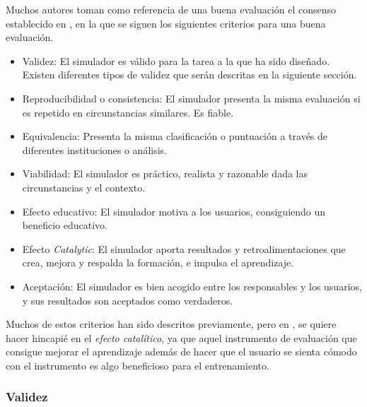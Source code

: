 Muchos autores toman como referencia de una buena evaluación el consenso establecido en  \cite{norcini2011criteria}, en la que se siguen los siguientes criterios para una buena evaluación.

\begin{itemize}
\item Validez: El simulador es válido para la tarea a la que ha sido diseñado. Existen diferentes tipos de validez que serán descritas en la siguiente sección.
\item Reproducibilidad o consistencia: El simulador presenta la misma evaluación si es repetido en circunstancias similares. Es fiable.
\item Equivalencia: Presenta la misma clasificación o puntuación a través de diferentes instituciones o análisis.
\item Viabilidad: El simulador es práctico, realista y razonable dada las circunstancias y el contexto.
\item Efecto educativo: El simulador motiva a los usuarios, consiguiendo un beneficio educativo.
\item Efecto \emph{Catalytic}: El simulador aporta resultados y retroalimentaciones que crea, mejora y respalda la formación, e impulsa el aprendizaje.
\item Aceptación: El simulador es bien acogido entre los responsables y los usuarios, y sus resultados son aceptados como verdaderos.
\end{itemize}

Muchos de estos criterios han sido descritos previamente, pero en \cite{norcini2011criteria}, se quiere hacer hincapié en el \emph{efecto catalítico}, ya que aquel instrumento de evaluación que consigue mejorar el aprendizaje además de hacer que el usuario se sienta cómodo con el instrumento es algo beneficioso para el entrenamiento.



\subsubsection{Validez}

